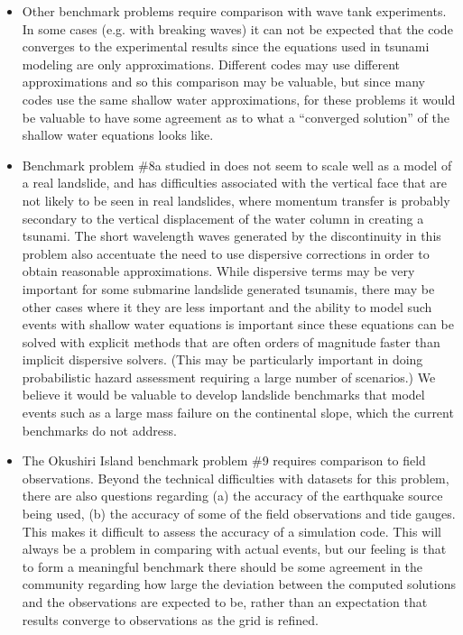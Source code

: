 \begin{itemize}
\item Other benchmark problems require comparison with wave tank
experiments.  In some cases (e.g. with breaking waves)
it can not be expected that the code converges to
the experimental results since the equations used in tsunami modeling are
only approximations.  Different codes may use different approximations and
so this comparison may be valuable, but since many codes use the same
shallow water approximations, 
for these problems it would be valuable to have some
agreement as to what a ``converged solution'' of the shallow water equations
looks like. 

\item Benchmark problem \#8a studied in  does not seem to scale
well as a model of a real landslide, and has difficulties
associated with the vertical face that are not likely to be seen in real
landslides, where momentum transfer is probably secondary to the vertical
displacement of the water column in creating a tsunami.  The short
wavelength waves generated by the discontinuity in this problem also
accentuate the need to use dispersive corrections in order to obtain
reasonable approximations.  While dispersive terms may be very 
important for some submarine landslide generated tsunamis, there may be
other cases where it they are less important and the ability to model such
events with shallow water equations is important since these equations can
be solved with explicit methods that are often orders of magnitude faster
than implicit dispersive solvers.  (This may be particularly important in
doing probabilistic hazard assessment requiring a large number of
scenarios.)  We believe it would be valuable to develop landslide benchmarks
that model events such as a large mass failure on the continental slope,
which the current benchmarks do not address.


\item The Okushiri Island benchmark problem \#9 requires comparison to field
observations.  Beyond the technical
difficulties with datasets for this problem, there
are also questions regarding (a) the accuracy of the earthquake source being
used, (b) the accuracy of some of the field observations and tide gauges.
This makes it difficult to assess the accuracy of a simulation code.  This
will always be a problem in comparing with actual events, but our feeling is
that to form a meaningful benchmark there should be some agreement in the
community regarding how large the deviation between the computed solutions
and the observations are expected to be, rather than an expectation that
results converge to observations as the grid is refined.
\end{itemize} 

